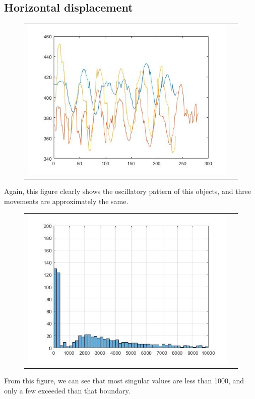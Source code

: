 \documentclass[12pt]{article}
\begin{document}
\subsection{Horizontal displacement}
\begin{figure}[H]
\begin{tabular}{cc}
  \includegraphics[width=\textwidth]{N_3.jpg}
\end{tabular}
\end{figure}
Again, this figure clearly shows the oscillatory pattern of this objects, and three movements are approximately the same.
\begin{figure}[H]
\begin{tabular}{cc}
  \includegraphics[width=\textwidth]{N_3_variance.jpg}
\end{tabular}
\end{figure}
From this figure, we can see that most singular values are less than 1000, and only a few exceeded than that boundary.
\end{document}
